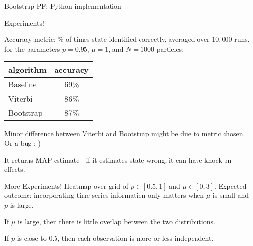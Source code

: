 \documentclass[pdf]
{beamer}
\begin{document}
\begin{frame}[fragile]{Bootstrap PF: Python implementation}
  \begin{figure}
  \centering
      \tiny
         
   \end{figure}
\end{frame}



\begin{frame}{Experiments!}

Accuracy metric: \% of times state identified correctly, averaged over $10,000$ runs, for the parameters $ p = 0.95 $, $\mu = 1$, and $N = 1000$ particles.

\vspace{5mm}

\begin{tabular}{ l | c }
  algorithm & accuracy \\
  \hline
  Baseline 	& 69\% \\
  Viterbi 	& 86\% \\
  Bootstrap & 87\% \\
 \end{tabular}

\vspace{5mm}

Minor difference between Viterbi and Bootstrap might be due to metric chosen. Or a bug :-)

It returns MAP estimate - if it estimates state wrong, it can have knock-on effects.

\end{frame}

\begin{frame}{More Experiments!}
Heatmap over grid of $p \in [0.5, 1]$ and $\mu \in [0, 3]$.
Expected outcome: incorporating time series information only matters when $\mu$ is small and $p$ is large.

If $\mu$ is large, then there is little overlap between the two distributions.

If $p$ is close to $0.5$, then each observation is more-or-less independent.
\end{frame}
\end{document}
